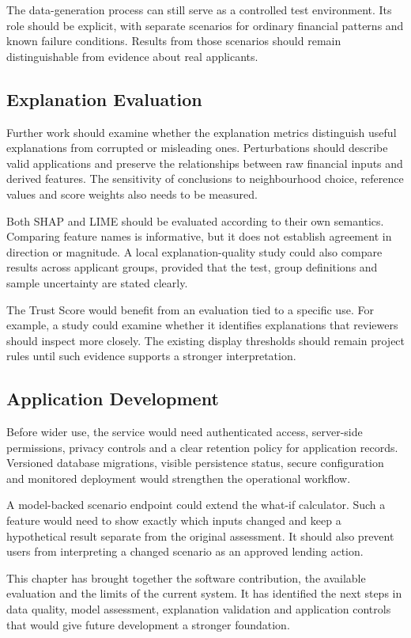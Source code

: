 The data-generation process can still serve as a controlled test environment. Its role should be explicit, with separate scenarios for ordinary financial patterns and known failure conditions. Results from those scenarios should remain distinguishable from evidence about real applicants.

\subsection{Explanation Evaluation}
Further work should examine whether the explanation metrics distinguish useful explanations from corrupted or misleading ones. Perturbations should describe valid applications and preserve the relationships between raw financial inputs and derived features. The sensitivity of conclusions to neighbourhood choice, reference values and score weights also needs to be measured.

Both SHAP and LIME should be evaluated according to their own semantics. Comparing feature names is informative, but it does not establish agreement in direction or magnitude. A local explanation-quality study could also compare results across applicant groups, provided that the test, group definitions and sample uncertainty are stated clearly.

The Trust Score would benefit from an evaluation tied to a specific use. For example, a study could examine whether it identifies explanations that reviewers should inspect more closely. The existing display thresholds should remain project rules until such evidence supports a stronger interpretation.

\subsection{Application Development}
Before wider use, the service would need authenticated access, server-side permissions, privacy controls and a clear retention policy for application records. Versioned database migrations, visible persistence status, secure configuration and monitored deployment would strengthen the operational workflow.

A model-backed scenario endpoint could extend the what-if calculator. Such a feature would need to show exactly which inputs changed and keep a hypothetical result separate from the original assessment. It should also prevent users from interpreting a changed scenario as an approved lending action.

\par\medskip\noindent
This chapter has brought together the software contribution, the available evaluation and the limits of the current system. It has identified the next steps in data quality, model assessment, explanation validation and application controls that would give future development a stronger foundation.
